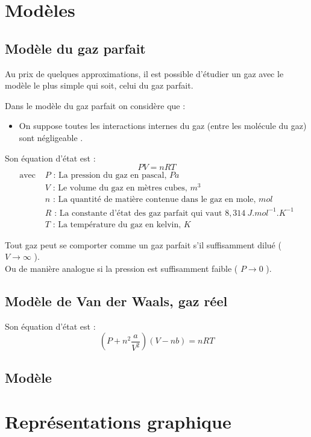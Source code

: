 \section{Modèles}
\subsection{Modèle du gaz parfait}
Au prix de quelques approximations, il est possible d'étudier un gaz avec le modèle le plus simple qui soit, celui du gaz parfait.
\begin{defi}
Dans le modèle du gaz parfait on considère que :
\begin{itemize}
    \item On suppose toutes les interactions internes du gaz (entre les molécule du gaz) sont négligeable .
\end{itemize}
Son équation d'état est :
$$PV=nRT$$
\begin{align*}
    \text{avec } & P\text{ : La pression du gaz en pascal, } Pa\\
    & V\text{ : Le volume du gaz en mètres cubes, } m^3\\
    & n\text{ : La quantité de matière contenue dans le gaz en mole, } mol\\
    & R\text{ : La constante d'état des gaz parfait qui vaut } 8,314\ J.mol^{-1}.K^{-1}\\
    & T\text{ : La température du gaz en kelvin, } K
\end{align*}
\end{defi}
\begin{rmq}
Tout gaz peut se comporter comme un gaz parfait s'il suffisamment dilué ( $V\to\infty$ ).\\ Ou de manière analogue si la pression est suffisamment faible ( $P\to 0$ ).
\end{rmq}
\subsection{Modèle de Van der Waals, gaz réel}
\begin{defi}
Son équation d'état est :
$$\left(P+n^2\frac{a}{V^2}\right)\left(V-nb\right)=nRT$$
\end{defi}
\subsection{Modèle}
\section{Représentations graphique}